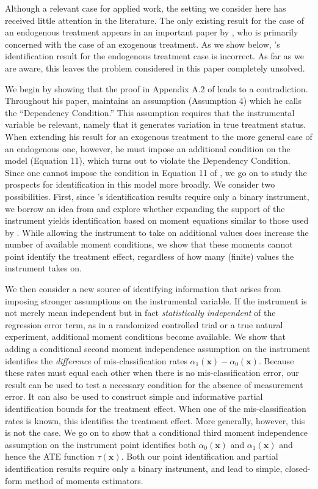 Although a relevant case for applied work, the setting we consider here has received little attention in the literature.
The only existing result for the case of an endogenous treatment appears in an important paper by \cite{Mahajan}, who is primarily concerned with the case of an exogenous treatment.
As we show below, \citeauthor{Mahajan}'s identification result for the endogenous treatment case is incorrect.
As far as we are aware, this leaves the problem considered in this paper completely unsolved.

We begin by showing that the proof in Appendix A.2 of \cite{Mahajan} leads to a contradiction.
Throughout his paper, \cite{Mahajan} maintains an assumption (Assumption 4) which he calls the ``Dependency Condition.'' 
This assumption requires that the instrumental variable be relevant, namely that it generates variation in true treatment status.
When extending his result for an exogenous treatment to the more general case of an endogenous one, however, he must impose an additional condition on the model (Equation 11), which turns out to violate the Dependency Condition.
Since one cannot impose the condition in Equation 11 of \cite{Mahajan}, we go on to study the prospects for identification in this model more broadly.
We consider two possibilities.
First, since \citeauthor{Mahajan}'s identification results require only a binary instrument,  we borrow an idea from \cite{Lewbel} and explore whether expanding the support of the instrument yields identification based on moment equations similar to those used by \cite{Mahajan}.
While allowing the instrument to take on additional values does increase the number of available moment conditions, we show that these moments cannot point identify the treatment effect, regardless of how many (finite) values the instrument takes on.

We then consider a new source of identifying information that arises from imposing stronger assumptions on the instrumental variable.
If the instrument is not merely mean independent but in fact \emph{statistically independent} of the regression error term, as in a randomized controlled trial or a true natural experiment, additional moment conditions become available.
We show that adding a conditional second moment independence assumption on the instrument identifies the \emph{difference} of mis-classification rates $\alpha_1(\mathbf{x})-\alpha_0(\mathbf{x})$. 
Because these rates must equal each other when there is no mis-classification error, our result can be used to test a necessary condition for the absence of measurement error.   
It can also be used to construct simple and informative partial identification bounds for the treatment effect.
When one of the mis-classification rates is known, this identifies the treatment effect.
More generally, however, this is not the case.
We go on to show that a conditional third moment independence assumption on the instrument point identifies both $\alpha_0(\mathbf{x})$ and $\alpha_1(\mathbf{x})$ and hence the ATE function $\tau(\mathbf{x})$. 
Both our point identification and partial identification results require only a binary instrument, and lead to simple, closed-form method of moments estimators.

